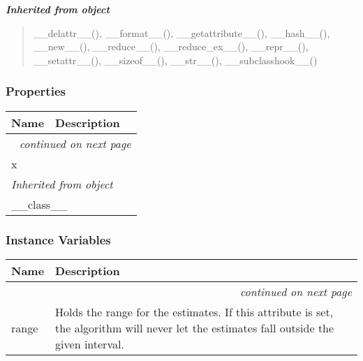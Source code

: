 \large{\textbf{\textit{Inherited from object}}}

\begin{quote}
\_\_delattr\_\_(), \_\_format\_\_(), \_\_getattribute\_\_(), \_\_hash\_\_(), \_\_new\_\_(), \_\_reduce\_\_(), \_\_reduce\_ex\_\_(), \_\_repr\_\_(), \_\_setattr\_\_(), \_\_sizeof\_\_(), \_\_str\_\_(), \_\_subclasshook\_\_()
\end{quote}


  \subsubsection{Properties}

    \vspace{-1cm}
\hspace{\varindent}\begin{longtable}{|p{\varnamewidth}|p{\vardescrwidth}|l}
\cline{1-2}
\cline{1-2} \centering \textbf{Name} & \centering \textbf{Description}& \\
\cline{1-2}
\endhead\cline{1-2}\multicolumn{3}{r}{\small\textit{continued on next page}}\\\endfoot\cline{1-2}
\endlastfoot\raggedright x\- & &\\
\cline{1-2}
\multicolumn{2}{|l|}{\textit{Inherited from object}}\\
\multicolumn{2}{|p{\varwidth}|}{\raggedright \_\_class\_\_}\\
\cline{1-2}
\end{longtable}



  \subsubsection{Instance Variables}

    \vspace{-1cm}
\hspace{\varindent}\begin{longtable}{|p{\varnamewidth}|p{\vardescrwidth}|l}
\cline{1-2}
\cline{1-2} \centering \textbf{Name} & \centering \textbf{Description}& \\
\cline{1-2}
\endhead\cline{1-2}\multicolumn{3}{r}{\small\textit{continued on next page}}\\\endfoot\cline{1-2}
\endlastfoot\raggedright r\-a\-n\-g\-e\- & Holds the range for the estimates. If this attribute is set, the
algorithm will never let the estimates fall outside the given
interval.&\\
\cline{1-2}
\end{longtable}

